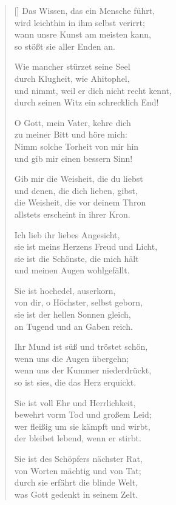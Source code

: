 \begin{multicols}{2}
\begin{verse}[\versewidth]
 Das Wissen, das ein Mensche führt,\\
wird leichthin in ihm selbst verirrt;\\
wann unsre Kunst am meisten kann,\\
so stößt sie aller Enden an.

 Wie mancher stürzet seine Seel\\
durch Klugheit, wie Ahitophel,\\
und nimmt, weil er dich nicht recht kennt,\\
durch seinen Witz ein schrecklich End!

 O Gott, mein Vater, kehre dich\\
zu meiner Bitt und höre mich:\\
Nimm solche Torheit von mir hin\\
und gib mir einen bessern Sinn!

 Gib mir die Weisheit, die du liebst\\
und denen, die dich lieben, gibst,\\
die Weisheit, die vor deinem Thron\\
allstets erscheint in ihrer Kron.

 Ich lieb ihr liebes Angesicht,\\
sie ist meins Herzens Freud und Licht,\\
sie ist die Schönste, die mich hält\\
und meinen Augen wohlgefällt.

 Sie ist hochedel, auserkorn,\\
von dir, o Höchster, selbst geborn,\\
sie ist der hellen Sonnen gleich,\\
an Tugend und an Gaben reich.

 Ihr Mund ist süß und tröstet schön,\\
wenn uns die Augen übergehn;\\
wenn uns der Kummer niederdrückt,\\
so ist sies, die das Herz erquickt.

 Sie ist voll Ehr und Herrlichkeit,\\
bewehrt vorm Tod und großem Leid;\\
wer fleißig um sie kämpft und wirbt,\\
der bleibet lebend, wenn er stirbt.

 Sie ist des Schöpfers nächster Rat,\\
von Worten mächtig und von Tat;\\
durch sie erfährt die blinde Welt,\\
was Gott gedenkt in seinem Zelt.


\end{verse}
\end{multicols}
